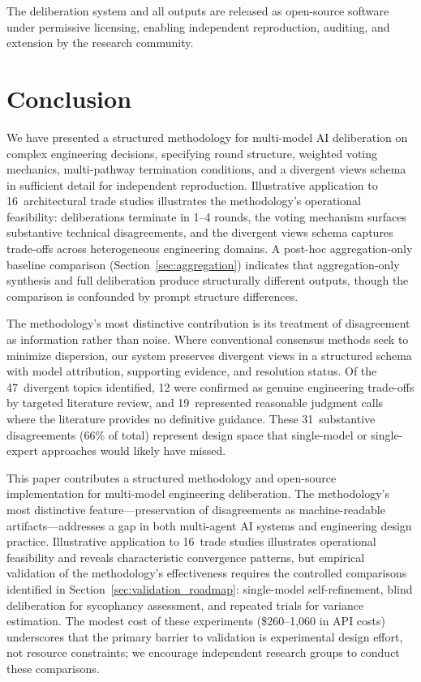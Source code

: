 \documentclass[11pt,a4paper]{article}
\begin{document}
The deliberation system and all outputs are released as open-source software under permissive licensing, enabling independent reproduction, auditing, and extension by the research community.

\section{Conclusion}
\label{sec:conclusion}

We have presented a structured methodology for multi-model AI deliberation on complex engineering decisions, specifying round structure, weighted voting mechanics, multi-pathway termination conditions, and a divergent views schema in sufficient detail for independent reproduction. Illustrative application to 16~architectural trade studies illustrates the methodology's operational feasibility: deliberations terminate in 1--4 rounds, the voting mechanism surfaces substantive technical disagreements, and the divergent views schema captures trade-offs across heterogeneous engineering domains. A post-hoc aggregation-only baseline comparison (Section~\ref{sec:aggregation}) indicates that aggregation-only synthesis and full deliberation produce structurally different outputs, though the comparison is confounded by prompt structure differences.

The methodology's most distinctive contribution is its treatment of disagreement as information rather than noise. Where conventional consensus methods seek to minimize dispersion, our system preserves divergent views in a structured schema with model attribution, supporting evidence, and resolution status. Of the 47~divergent topics identified, 12 were confirmed as genuine engineering trade-offs by targeted literature review, and 19~represented reasonable judgment calls where the literature provides no definitive guidance. These 31~substantive disagreements (66\% of total) represent design space that single-model or single-expert approaches would likely have missed.

This paper contributes a structured methodology and open-source implementation for multi-model engineering deliberation. The methodology's most distinctive feature---preservation of disagreements as machine-readable artifacts---addresses a gap in both multi-agent AI systems and engineering design practice. Illustrative application to 16~trade studies illustrates operational feasibility and reveals characteristic convergence patterns, but empirical validation of the methodology's effectiveness requires the controlled comparisons identified in Section~\ref{sec:validation_roadmap}: single-model self-refinement, blind deliberation for sycophancy assessment, and repeated trials for variance estimation. The modest cost of these experiments (\$260--1{,}060 in API costs) underscores that the primary barrier to validation is experimental design effort, not resource constraints; we encourage independent research groups to conduct these comparisons.
\end{document}
